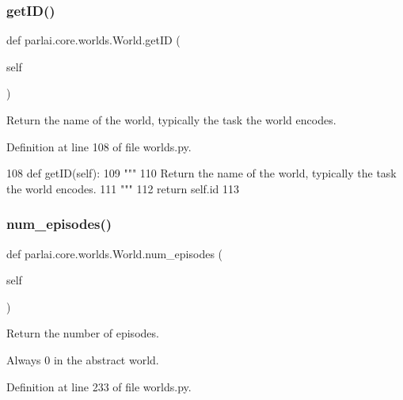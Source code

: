 \subsubsection{\texorpdfstring{get\+I\+D()}{getID()}}
{\footnotesize\ttfamily def parlai.\+core.\+worlds.\+World.\+get\+ID (\begin{DoxyParamCaption}\item[{}]{self }\end{DoxyParamCaption})}

\begin{DoxyVerb}Return the name of the world, typically the task the world encodes.
\end{DoxyVerb}
 

Definition at line 108 of file worlds.\+py.


\begin{DoxyCode}
108     \textcolor{keyword}{def }getID(self):
109         \textcolor{stringliteral}{"""}
110 \textcolor{stringliteral}{        Return the name of the world, typically the task the world encodes.}
111 \textcolor{stringliteral}{        """}
112         \textcolor{keywordflow}{return} self.id
113 
\end{DoxyCode}
\mbox{\label{classparlai_1_1core_1_1worlds_1_1World_a7c7258c4ad6a6bdfc76287832876a25d}} 
\subsubsection{\texorpdfstring{num\+\_\+episodes()}{num\_episodes()}}
{\footnotesize\ttfamily def parlai.\+core.\+worlds.\+World.\+num\+\_\+episodes (\begin{DoxyParamCaption}\item[{}]{self }\end{DoxyParamCaption})}

\begin{DoxyVerb}Return the number of episodes.

Always 0 in the abstract world.
\end{DoxyVerb}
 

Definition at line 233 of file worlds.\+py.


